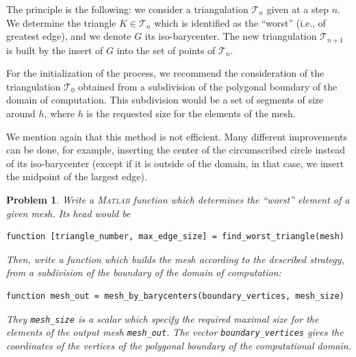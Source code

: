 \documentclass[11pt,a4paper,center,notitlepage]{article}
\numberwithin{equation}{section}
\newtheorem{prob}{Problem}[section]
\begin{document}
The principle is the following: we consider a triangulation $\mathcal{T}_n$ given at a step $n$. We determine the triangle $K\in \mathcal{T}_n$ which is identified as the ``worst'' (i.e., of greatest edge), and we denote $G$ its iso-barycenter. The new triangulation $\mathcal{T}_{n+1}$ is built by the insert of $G$ into the set of points of $\mathcal{T}_n$.

For the initialization of the process, we recommend the consideration of the triangulation $\mathcal{T}_0$ obtained from a subdivision of the polygonal boundary of the domain of computation. This subdivision would be a set of segments of size around $h$, where $h$ is the requested size for the elements of the mesh.

We mention again that this method is not efficient. Many different improvements can be done, for example, inserting the center of the circumscribed circle instead of its iso-barycenter (except if it is outside of the domain, in that case, we insert the midpoint of the largest edge).

\begin{prob}
Write a \textsc{Matlab} function which determines the ``worst'' element of a given mesh. Its head would be
\begin{verbatim}
function [triangle_number, max_edge_size] = find_worst_triangle(mesh)
\end{verbatim}
Then, write a function which builds the mesh according to the described strategy, from a subdivision of the boundary of the domain of computation:
\begin{verbatim}
function mesh_out = mesh_by_barycenters(boundary_vertices, mesh_size)
\end{verbatim}
They \verb|mesh_size| is a scalar which specify the required maximal size for the elements of the output mesh \verb|mesh_out|. The vector \verb|boundary_vertices| gives the coordinates of the vertices of the polygonal boundary of the computational domain.
\end{prob}
\end{document}
